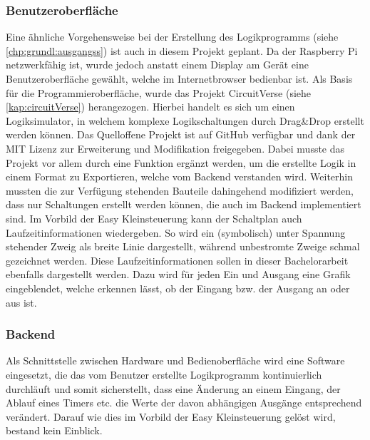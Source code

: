 \subsubsection{Benutzeroberfläche} \label{kap:grundl:bedienoberfl}
Eine ähnliche Vorgehensweise bei der Erstellung des Logikprogramms (siehe \autoref{chp:grundl:ausgangss}) ist auch in diesem Projekt geplant. Da der Raspberry Pi netzwerkfähig ist, wurde jedoch anstatt einem Display am Gerät eine Benutzeroberfläche gewählt, welche im Internetbrowser bedienbar ist. Als Basis für die Programmieroberfläche, wurde das Projekt CircuitVerse \cite{URL:CircuitVerse} (siehe \autoref{kap:circuitVerse}) herangezogen. Hierbei handelt es sich um einen Logiksimulator, in welchem komplexe Logikschaltungen durch Drag\&Drop erstellt werden können. Das Quelloffene Projekt ist auf GitHub \cite{URL:CircuitVerseGit} verfügbar und dank der MIT Lizenz zur Erweiterung und Modifikation freigegeben. Dabei musste das Projekt vor allem durch eine Funktion ergänzt werden, um die erstellte Logik in einem Format zu Exportieren, welche vom Backend verstanden wird. Weiterhin mussten die zur Verfügung stehenden Bauteile dahingehend modifiziert werden, dass nur Schaltungen erstellt werden können, die auch im Backend implementiert sind. 
Im Vorbild der Easy Kleinsteuerung kann der Schaltplan auch Laufzeitinformationen wiedergeben. So wird ein (symbolisch) unter Spannung stehender Zweig als breite Linie dargestellt, während unbestromte Zweige schmal gezeichnet werden. Diese Laufzeitinformationen sollen in dieser Bachelorarbeit ebenfalls dargestellt werden. Dazu wird für jeden Ein und Ausgang eine Grafik eingeblendet, welche erkennen lässt, ob der Eingang bzw. der Ausgang an oder aus ist.
\subsubsection{Backend} \label{chp:grundl:backend}
Als Schnittstelle zwischen Hardware und Bedienoberfläche wird eine Software eingesetzt, die das vom Benutzer erstellte Logikprogramm kontinuierlich durchläuft und somit sicherstellt, dass eine Änderung an einem Eingang, der Ablauf eines Timers etc. die Werte der davon abhängigen Ausgänge entsprechend verändert. Darauf wie dies im Vorbild der Easy Kleinsteuerung gelöst wird, bestand kein Einblick.  

